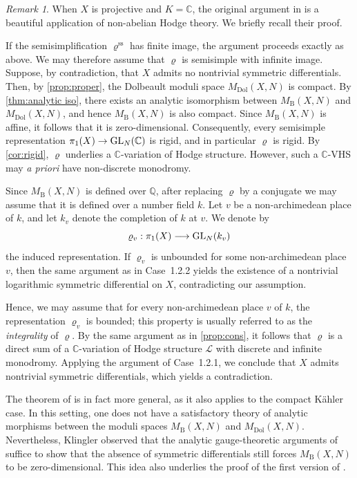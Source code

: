 \documentclass[english]{amsproc}
\theoremstyle{plain}
\theoremstyle{definition}
\theoremstyle{remark}
\newtheorem{rem}[thm]{Remark}
\theoremstyle{plain}
\numberwithin{equation}{thm} %
\newcommand{\bC}{\mathbb{C}}
\newcommand{\GL}{{\rm GL}}
\begin{document}
\begin{rem}
	When $X$ is projective and $K=\bC$, the original argument in \cite{BKT13} is a
	beautiful application of non-abelian Hodge theory. We briefly recall their proof.
	 
If the semisimplification \(\varrho^{\mathrm{ss}}\) has finite image, the argument proceeds 
exactly as above. We may therefore assume that \(\varrho\) is semisimple with infinite image.
Suppose, by contradiction, that \(X\) admits no nontrivial symmetric differentials.
Then, by \cref{prop:proper}, the Dolbeault moduli space \(M_{\mathrm{Dol}}(X,N)\) is compact.
By \cref{thm:analytic iso}, there exists an analytic isomorphism between 
\(M_{\mathrm{B}}(X,N)\) and \(M_{\mathrm{Dol}}(X,N)\), and hence \(M_{\mathrm{B}}(X,N)\) is also 
compact. Since \(M_{\mathrm{B}}(X,N)\) is affine, it follows that it is zero-dimensional.
Consequently, every semisimple representation $\pi_1(X)\to \GL_{N}(\bC)$ is rigid, and in 
particular \(\varrho\) is rigid. By \cref{cor:rigid}, \(\varrho\) underlies a 
\(\mathbb{C}\)-variation of Hodge structure. However, such a \(\mathbb{C}\)-VHS may \emph{a 
	priori} have non-discrete monodromy.

Since \(M_{\mathrm{B}}(X,N)\) is defined over \(\mathbb{Q}\), after replacing \(\varrho\) by a 
conjugate we may assume that it is defined over a number field \(k\). Let \(v\) be a 
non-archimedean place of \(k\), and let \(k_v\) denote the completion of \(k\) at \(v\).
We denote by
\[
\varrho_v:\pi_1(X)\longrightarrow \GL_N(k_v)
\]
the induced representation. If \(\varrho_v\) is unbounded for some non-archimedean place \(v\), then the same 
argument as in Case~1.2.2 yields the existence of a nontrivial logarithmic symmetric 
differential on \(X\), contradicting our assumption.
	
 Hence, we may assume that for every non-archimedean place \(v\) of \(k\), the representation 
 \(\varrho_v\) is bounded; this property is usually referred to as the \emph{integrality} of 
 \(\varrho\). 
 By the same argument as in \cref{prop:cons}, it follows that \(\varrho\) is a direct sum of a 
 \(\mathbb{C}\)-variation of Hodge structure \(\mathcal{L}\) with discrete and infinite 
 monodromy. 
 Applying the argument of Case~1.2.1, we conclude that \(X\) admits nontrivial symmetric 
 differentials, which yields a contradiction.
  
  \medspace
  
 The theorem of \cite{BKT13} is in fact more general, as it also applies to the compact 
 K\"ahler case. 
 In this setting, one does not have a satisfactory theory of analytic morphisms between the 
 moduli spaces \(M_{\mathrm{B}}(X,N)\) and \(M_{\mathrm{Dol}}(X,N)\).
 Nevertheless, Klingler \cite{Kli13} observed that the analytic gauge-theoretic arguments of 
 \cite{Sim92} suffice to show that the absence of symmetric differentials still forces 
 \(M_{\mathrm{B}}(X,N)\) to be zero-dimensional. 
 This idea also underlies the proof of the first version of \cite{BDDM}. 
\end{rem}
\end{document}
